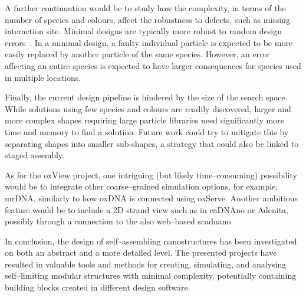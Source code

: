 
A further continuation would be to study how the complexity, in terms of the number of species and colours, affect the robustness to defects, such as missing interaction site. Minimal designs are typically more robust to random design errors~\cite{greenbury2016genetic, johnston2021}. In a minimal design, a faulty individual particle is expected to be more easily replaced by another particle of the same species. However, an error affecting an entire species is expected to have larger consequences for species used in multiple locations. 

Finally, the current design pipeline is hindered by the size of the search space. While solutions using few species and colours are readily discovered, larger and more complex shapes requiring large particle libraries need significantly more time and memory to find a solution. Future work could try to mitigate this by separating shapes into smaller sub-shapes, a strategy that could also be linked to staged assembly.

As for the oxView project, one intriguing (but likely time--consuming) possibility would be to integrate other coarse--grained simulation options, for example, mrDNA, similarly to how oxDNA is connected using oxServe. Another ambitious feature would be to include a 2D strand view such as in caDNAno or Adenita, possibly through a connection to the also web--based scadnano.

In conclusion, the design of self--assembling nanostructures has been investigated on both an abstract and a more detailed level. The presented projects have resulted in valuable tools and methods for creating, simulating, and analysing self--limiting modular structures with minimal complexity, potentially containing building blocks created in different design software.